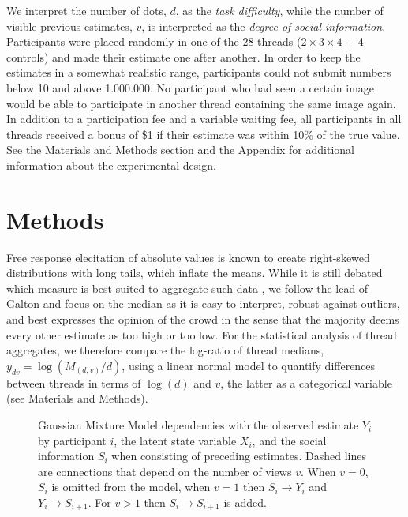 \documentclass[9pt,a4paper,twocolumn,lineno]{article}
\begin{document}
We interpret the number of dots, $d$, as the \textit{task difficulty}, while the number of visible previous estimates, $v$, is interpreted as the \textit{degree of social information}. Participants were placed randomly in one of the 28 threads ($2 \times 3 \times 4$ + 4 controls)  and made their estimate one after another. In order to keep the estimates in a somewhat realistic range, participants could not submit numbers below 10 and above 1.000.000. No participant who had seen a certain image would be able to participate in another thread containing the same image again. In addition to a participation fee and a variable waiting fee, all participants in all threads received a bonus of \$1 if their estimate was within 10\% of the true value. See the Materials and Methods section and the Appendix for additional information about the experimental design.

\section*{Methods}
Free response elecitation of absolute values is known to create right-skewed distributions with long tails, which inflate the means. While it is still debated which measure is best suited to aggregate such data \cite{kao2018counteracting}, we follow the lead of Galton \cite{galton1907vox} and focus on the median as it is easy to interpret, robust against outliers, and best expresses the opinion of the crowd in the sense that the majority deems every other estimate as too high or too low. For the statistical analysis of thread aggregates, we therefore compare the log-ratio of thread medians, $y_{dv}=\log(M_{(d,v)}/d)$, using a linear normal model to quantify differences between threads in terms of $\log(d)$ and $v$, the latter as a categorical variable (see Materials and Methods). 

\begin{figure}[h]
\centering
{}
	\caption{Gaussian Mixture Model dependencies with the observed estimate $Y_i$ by participant $i$, the latent state variable $X_i$, and the social information $S_i$ when consisting of preceding estimates. Dashed lines are connections that depend on the number of views $v$. When $v=0$, $S_i$ is omitted from the model, when $v=1$ then $S_i\to Y_i$ and $Y_i\to S_{i+1}$. For $v>1$ then $S_i\to S_{i+1}$ is added.}
\label{fig:model}
\end{figure}
\end{document}

